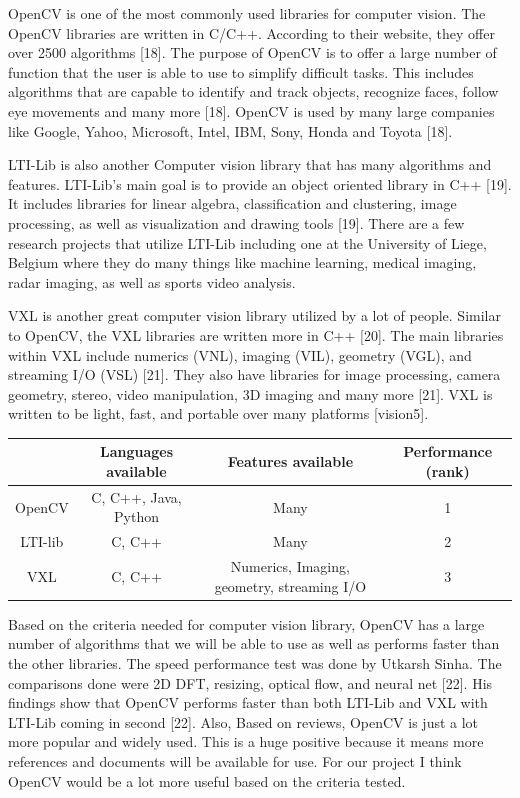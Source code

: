 \documentclass[onecolumn, draftclsnofoot,10pt, compsoc]{IEEEtran}
\begin{document}
OpenCV is one of the most commonly used libraries for computer vision.
The OpenCV libraries are written in C/C++.
According to their website, they offer over 2500 algorithms [18].
The purpose of OpenCV is to offer a large number of function that the user is able to use to simplify difficult tasks.
This includes algorithms that are capable to identify and track objects, recognize faces, follow eye movements and many more [18].
OpenCV is used by many large companies like Google, Yahoo, Microsoft, Intel, IBM, Sony, Honda and Toyota [18]. 

LTI-Lib is also another Computer vision library that has many algorithms and features.
LTI-Lib's main goal is to provide an object oriented library in C++ [19].
It includes libraries for linear algebra, classification and clustering, image processing, as well as visualization and drawing tools [19].
There are a few research projects that utilize LTI-Lib including one at the University of Liege, Belgium where they do many things like machine learning, medical imaging, radar imaging, as well as sports video analysis.


VXL is another great computer vision library utilized by a lot of people.
Similar to OpenCV, the VXL libraries are written more in C++ [20].
The main libraries within VXL include numerics (VNL), imaging (VIL), geometry (VGL), and streaming I/O (VSL) [21].
They also have libraries for image processing, camera geometry, stereo, video manipulation, 3D imaging and many more [21].
VXL is written to be light, fast, and portable over many platforms [vision5].


\begin{center}
	\begin{tabular}{|c|c|c|c|}
		
		\hline
		\textbf{} & \textbf{Languages available} & \textbf{Features available} & \textbf{Performance (rank)} \\
		\hline
		OpenCV & C, C++, Java, Python & Many & 1 \\
		\hline
		LTI-lib & C, C++ & Many & 2 \\
		\hline
		VXL & C, C++ & Numerics, Imaging, geometry, streaming I/O & 3 \\
		\hline
		
	\end{tabular}
\end{center}

Based on the criteria needed for computer vision library, OpenCV has a large number of algorithms that we will be able to use as well as performs faster than the other libraries.
The speed performance test was done by Utkarsh Sinha.
The comparisons done were 2D DFT, resizing, optical flow, and neural net [22].
His findings show that OpenCV performs faster than both LTI-Lib and VXL with LTI-Lib coming in second [22].
Also, Based on reviews, OpenCV is just a lot more popular and widely used.
This is a huge positive because it means more references and documents will be available for use.
For our project I think OpenCV would be a lot more useful based on the criteria tested.
\end{document}
